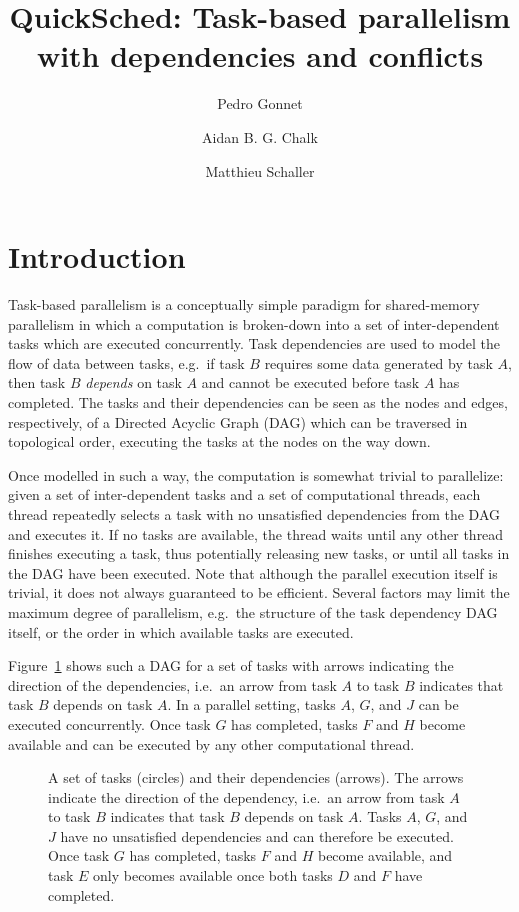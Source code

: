 \documentclass[fleqn,10pt]{wlpeerj}
\title{QuickSched: Task-based parallelism with dependencies and conflicts}
\author[1,3]{Pedro Gonnet}
\author[1]{Aidan B. G. Chalk}
\author[2]{Matthieu Schaller}
\affil[1]{School of Engineering and Computing Sciences, Durham University, United Kingdom.}
\affil[2]{Institute for Computational Cosmology, Durham University, United Kingdom.}
\affil[3]{Google Switzerland GmbH, Z\"urich, Switzerland.}
\newcommand{\fig}[1]
    {Figure~\ref{fig:#1}}
\begin{document}
\flushbottom
\maketitle
\thispagestyle{empty}


\section{Introduction}

Task-based parallelism is a conceptually simple paradigm for
shared-memory parallelism in which a computation is broken-down
into a set of inter-dependent tasks which are executed
concurrently.
Task dependencies are used to model the flow of data between
tasks, e.g.~if task $B$ requires some data generated by task $A$,
then task $B$ {\em depends} on task $A$ and cannot be executed
before task $A$ has completed.
The tasks and their dependencies can be seen as the nodes and edges,
respectively, of a Directed Acyclic Graph (DAG) which can be
traversed in topological order, executing the tasks at the nodes
on the way down.

Once modelled in such a way, the computation is somewhat trivial
to parallelize:
given a set of inter-dependent tasks and a set of computational
threads, each thread repeatedly selects a task with no
unsatisfied dependencies from the DAG and executes it.
If no tasks are available, the thread waits until any other
thread finishes executing a task, thus potentially releasing
new tasks, or until all tasks in the DAG have been executed.
Note that although the parallel execution
itself is trivial, it does not always guaranteed to be efficient.
Several factors may limit the maximum degree of parallelism, e.g.~the
structure of the task dependency DAG itself, or the order in which
available tasks are executed.

\fig{Tasks} shows such a DAG for a set of tasks with
arrows indicating the direction of the dependencies, i.e.~an
arrow from task $A$ to task $B$ indicates that task $B$ depends
on task $A$.
In a parallel setting, tasks $A$, $G$, and $J$ can be
executed concurrently.
Once task $G$ has completed, tasks $F$ and $H$ become available
and can be executed by any other computational thread.


\begin{figure}
    \centerline{}
    \caption{A set of tasks (circles) and their dependencies (arrows).
        The arrows indicate the direction of the dependency, i.e.~an
        arrow from task $A$ to task $B$ indicates that task $B$ depends
        on task $A$.
        Tasks $A$, $G$, and $J$ have no unsatisfied dependencies and
        can therefore be executed.
        Once task $G$ has completed, tasks $F$ and $H$ become available,
        and task $E$ only becomes available once both tasks $D$ and $F$
        have completed.}
    \label{fig:Tasks}
\end{figure}
\end{document}
